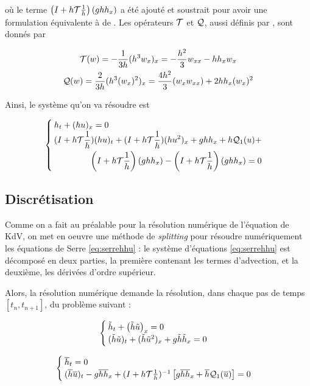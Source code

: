 \noindent où le terme $\left(I + h\mathcal{T}\frac{1}{h} \right)(ghh_x)$ a été ajouté et soustrait pour avoir une formulation équivalente à de \cite{Bonneton2011}. Les opérateurs $\mathcal{T}$ et $\mathcal{Q}$, aussi définis par \cite{Bonneton2011}, sont donnés par

\begin{gather*}
	\mathcal{T}(w) = -\frac{1}{3h}(h^3w_x)_x = -\frac{h^2}{3}w_{xx} - hh_xw_x \\
	\mathcal{Q}(w) = \frac{2}{3h}(h^3(w_x)^2  )_x = \frac{4h^2}{3}(w_xw_{xx}) + 2hh_x(w_x)^2
\end{gather*}

\indent Ainsi, le système qu'on va résoudre est 

\begin{equation}
\label{eq:serrehhu}
\begin{cases}
h_t + (hu)_x = 0 \\
\begin{split}
(I + h\mathcal{T}\frac{1}{h}) (hu)_t + (I + h\mathcal{T}\frac{1}{h})(hu^2)_x + ghh_x + h\mathcal{Q}_1(u) + \\ \left(I + h\mathcal{T}\frac{1}{h} \right) (ghh_x) - \left(I + h\mathcal{T}\frac{1}{h} \right) (ghh_x) = 0
\end{split}
\end{cases}
\end{equation}


\subsection{Discrétisation}

\indent Comme on a fait au préalable pour la résolution numérique de l'équation de KdV, on met en oeuvre une méthode de \emph{splitting} pour résoudre numériquement les équations de Serre \eqref{eq:serrehhu} : le système d'équations \eqref{eq:serrehhu} est décomposé en deux parties, la première contenant les termes d'advection, et la deuxième, les dérivées d'ordre supérieur.

\indent Alors, la résolution numérique demande la résolution, dans chaque pas de temps $[t_n, t_{n+1}]$, du problème suivant :

\begin{equation}
	\label{eq:splitSerre1}
	\begin{cases}
		\tilde{h}_t + \left(\tilde{h}\tilde{u}\right)_x = 0 \\
		(\tilde{h}\tilde{u})_t + (\tilde{h}\tilde{u}^2)_x + g\tilde{h}\tilde{h}_x = 0 
	\end{cases}	
\end{equation}

\begin{equation}
	\label{eq:splitSerre2}
	\begin{cases}
		\overline{h}_t = 0 \\
		(\overline{h}\overline{u})_t  -g\overline{h}\overline{h}_x + (I + h\mathcal{T}\frac{1}{h})^{-1}\left[ g\overline{h}\overline{h}_x + \overline{h}\mathcal{Q}_1(\overline{u}) \right] = 0
	\end{cases}	
\end{equation}

